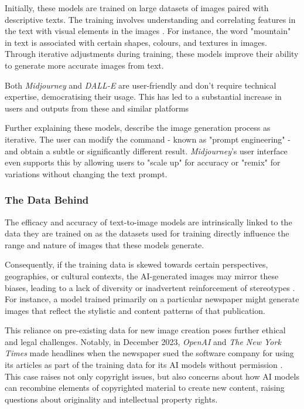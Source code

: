Initially, these models are trained on large datasets of images paired with descriptive texts. The training involves understanding and correlating features in the text with visual elements in the images \parencite{Bie2023}. For instance, the word "mountain" in text is associated with certain shapes, colours, and textures in images. Through iterative adjustments during training, these models improve their ability to generate more accurate images from text.

Both \textit{Midjourney} and \textit{DALL-E} are user-friendly and don't require technical expertise, democratising their usage. This has led to a substantial increase in users and outputs from these and similar platforms \parencite[5]{Thomas2023}

Further explaining these models, \textcite[5]{Thomas2023} describe the image generation process as iterative. The user can modify the command - known as "prompt engineering" \parencite{Liu2022} - and obtain a subtle or significantly different result. \textit{Midjourney}'s user interface even supports this by allowing users to "scale up" for accuracy or "remix" for variations without changing the text prompt.

\subsubsection{The Data Behind}
The efficacy and accuracy of text-to-image models are intrinsically linked to the data they are trained on as the datasets used for training directly influence the range and nature of images that these models generate. 

Consequently, if the training data is skewed towards certain perspectives, geographies, or cultural contexts, the AI-generated images may mirror these biases, leading to a lack of diversity or inadvertent reinforcement of stereotypes \parencite{Mehrabi2022}. For instance, a model trained primarily on a particular newspaper might generate images that reflect the stylistic and content patterns of that publication.

This reliance on pre-existing data for new image creation poses further ethical and legal challenges. Notably, in December 2023, \textit{OpenAI} and \textit{The New York Times} made headlines when the newspaper sued the software company for using its articles as part of the training data for its AI models without permission \parencite{Miller2023}. This case raises not only copyright issues, but also concerns about how AI models can recombine elements of copyrighted material to create new content, raising questions about originality and intellectual property rights.

